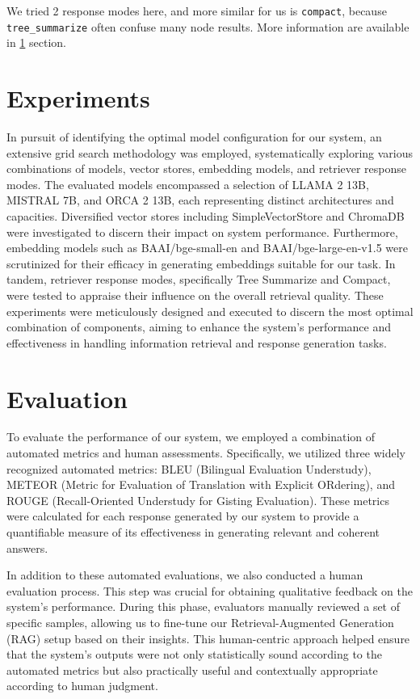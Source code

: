 \documentclass[conference, 11pt]{IEEEtran}
\begin{document}
We tried 2 response modes here, and more similar for us is \texttt{compact}, because \texttt{tree\_summarize} often confuse many node results. More information are available in \ref{experiments} section.

\section{Experiments}
\label{experiments}

In pursuit of identifying the optimal model configuration for our system, an extensive grid search methodology was employed, systematically exploring various combinations of models, vector stores, embedding models, and retriever response modes. The evaluated models encompassed a selection of LLAMA 2 13B, MISTRAL 7B, and ORCA 2 13B, each representing distinct architectures and capacities. Diversified vector stores including SimpleVectorStore and ChromaDB were investigated to discern their impact on system performance. Furthermore, embedding models such as BAAI/bge-small-en and BAAI/bge-large-en-v1.5 were scrutinized for their efficacy in generating embeddings suitable for our task. In tandem, retriever response modes, specifically Tree Summarize and Compact, were tested to appraise their influence on the overall retrieval quality. These experiments were meticulously designed and executed to discern the most optimal combination of components, aiming to enhance the system's performance and effectiveness in handling information retrieval and response generation tasks.

\section{Evaluation}
To evaluate the performance of our system, we employed a combination of automated metrics and human assessments. Specifically, we utilized three widely recognized automated metrics: BLEU (Bilingual Evaluation Understudy), METEOR (Metric for Evaluation of Translation with Explicit ORdering), and ROUGE (Recall-Oriented Understudy for Gisting Evaluation). These metrics were calculated for each response generated by our system to provide a quantifiable measure of its effectiveness in generating relevant and coherent answers.

In addition to these automated evaluations, we also conducted a human evaluation process. This step was crucial for obtaining qualitative feedback on the system's performance. During this phase, evaluators manually reviewed a set of specific samples, allowing us to fine-tune our Retrieval-Augmented Generation (RAG) setup based on their insights. This human-centric approach helped ensure that the system's outputs were not only statistically sound according to the automated metrics but also practically useful and contextually appropriate according to human judgment.
\end{document}

